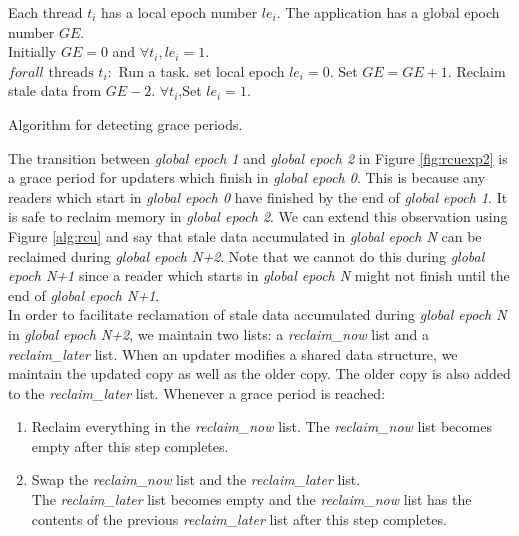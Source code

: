 \documentclass[a4paper]{article}
\begin{document}
\begin{algorithm}[float=tph]
\begin{algorithmic}
{
\STATE Each thread $t_i$ has a local epoch number $le_i$.
\STATE The application has a global epoch number $GE$.\\
\STATE Initially  $GE=0$ and $\forall t_i, le_i=1$. \\
\STATE $forall \mbox{ threads }t_i:$
\STATE Run a task.
\STATE set local epoch  $le_i=0$.
  \STATE Set $GE=GE+1$.
  \STATE Reclaim stale data from $GE-2$.
  \STATE $\forall t_i$,Set $le_i=1$.
\ENDIF
\ENDWHILE
}
\caption{Algorithm for detecting grace periods.}
\label{alg:rcu}
\end{algorithmic}
\end{algorithm}
The transition between \emph{global epoch 1} and \emph{global epoch 2} in Figure \ref{fig:rcuexp2} is a grace period for updaters which finish in \emph{global epoch 0}. This is because any readers which start in \emph{global epoch 0} have finished by the end of \emph{global epoch 1}. It is safe to reclaim memory in \emph{global epoch 2}. We can extend this observation using Figure \ref{alg:rcu} and say that stale data accumulated in \emph{global epoch N} can be reclaimed during \emph{global epoch N+2}. Note that we cannot do this during \emph{global epoch N+1} since a reader which starts in \emph{global epoch N} might not finish until the end of \emph{global epoch N+1}.\\

In order to facilitate reclamation of stale data accumulated during \emph{global epoch N} in \emph{global epoch N+2}, we maintain two lists: a \emph{reclaim\_now} list and a \emph{reclaim\_later} list. When an updater modifies a shared data structure, we maintain the updated copy as well as the older copy. The older copy is also added to the \emph{reclaim\_later} list. Whenever a grace period is reached:
\begin{enumerate}
\item Reclaim everything in the \emph{reclaim\_now} list. The \emph{reclaim\_now} list becomes empty after this step completes.
\item Swap the \emph{reclaim\_now} list and the \emph{reclaim\_later} list.\\
The \emph{reclaim\_later} list becomes empty and the \emph{reclaim\_now} list has the contents of the previous \emph{reclaim\_later} list after this step completes.
\end{enumerate}
\end{document}
